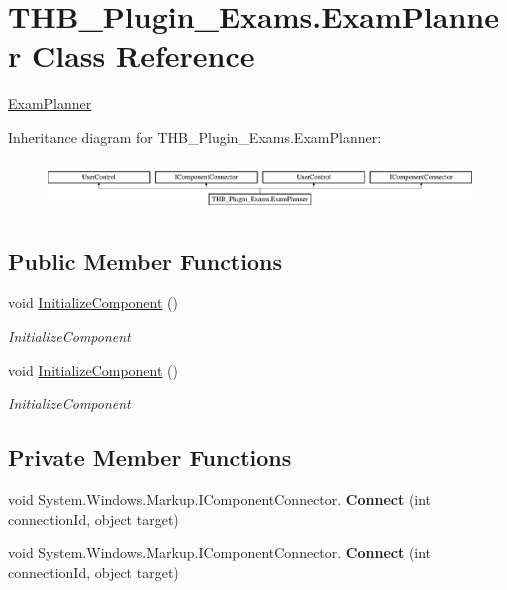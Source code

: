 \hypertarget{class_t_h_b___plugin___exams_1_1_exam_planner}{}\section{T\+H\+B\+\_\+\+Plugin\+\_\+\+Exams.\+Exam\+Planner Class Reference}
\label{class_t_h_b___plugin___exams_1_1_exam_planner}


\mbox{\hyperlink{class_t_h_b___plugin___exams_1_1_exam_planner}{Exam\+Planner}}  


Inheritance diagram for T\+H\+B\+\_\+\+Plugin\+\_\+\+Exams.\+Exam\+Planner\+:\begin{figure}[H]
\begin{center}
\leavevmode
\includegraphics[height=1.352657cm]{df/df8/class_t_h_b___plugin___exams_1_1_exam_planner}
\end{center}
\end{figure}
\subsection*{Public Member Functions}
\begin{DoxyCompactItemize}
\item 
void \mbox{\hyperlink{class_t_h_b___plugin___exams_1_1_exam_planner_aa5d0299d3f5a4130f99df3b9628d2f7a}{Initialize\+Component}} ()
\begin{DoxyCompactList}\small\item\em Initialize\+Component \end{DoxyCompactList}\item 
void \mbox{\hyperlink{class_t_h_b___plugin___exams_1_1_exam_planner_aa5d0299d3f5a4130f99df3b9628d2f7a}{Initialize\+Component}} ()
\begin{DoxyCompactList}\small\item\em Initialize\+Component \end{DoxyCompactList}\end{DoxyCompactItemize}
\subsection*{Private Member Functions}
\begin{DoxyCompactItemize}
\item 
\mbox{\label{class_t_h_b___plugin___exams_1_1_exam_planner_a962a9efa9aaa49f756df8f7d4aed664d}} 
void System.\+Windows.\+Markup.\+I\+Component\+Connector. {\bfseries Connect} (int connection\+Id, object target)
\item 
\mbox{\label{class_t_h_b___plugin___exams_1_1_exam_planner_a962a9efa9aaa49f756df8f7d4aed664d}} 
void System.\+Windows.\+Markup.\+I\+Component\+Connector. {\bfseries Connect} (int connection\+Id, object target)
\end{DoxyCompactItemize}
